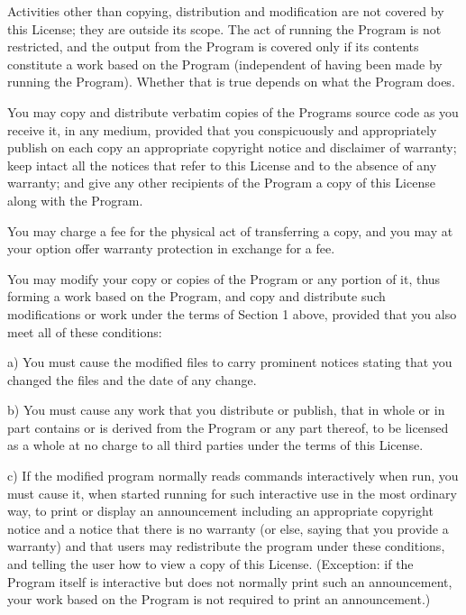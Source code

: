 Activities other than copying, distribution and modification are not covered by this License; they are outside its scope. The act of running the Program is not restricted, and the output from the Program is covered only if its contents constitute a work based on the Program (independent of having been made by running the Program). Whether that is true depends on what the Program does.


\begin{DoxyEnumerate}
\item You may copy and distribute verbatim copies of the Program\textquotesingle{}s source code as you receive it, in any medium, provided that you conspicuously and appropriately publish on each copy an appropriate copyright notice and disclaimer of warranty; keep intact all the notices that refer to this License and to the absence of any warranty; and give any other recipients of the Program a copy of this License along with the Program.
\end{DoxyEnumerate}

You may charge a fee for the physical act of transferring a copy, and you may at your option offer warranty protection in exchange for a fee.


\begin{DoxyEnumerate}
\item You may modify your copy or copies of the Program or any portion of it, thus forming a work based on the Program, and copy and distribute such modifications or work under the terms of Section 1 above, provided that you also meet all of these conditions\+: \begin{DoxyVerb}a) You must cause the modified files to carry prominent notices
stating that you changed the files and the date of any change.

b) You must cause any work that you distribute or publish, that in
whole or in part contains or is derived from the Program or any
part thereof, to be licensed as a whole at no charge to all third
parties under the terms of this License.

c) If the modified program normally reads commands interactively
when run, you must cause it, when started running for such
interactive use in the most ordinary way, to print or display an
announcement including an appropriate copyright notice and a
notice that there is no warranty (or else, saying that you provide
a warranty) and that users may redistribute the program under
these conditions, and telling the user how to view a copy of this
License.  (Exception: if the Program itself is interactive but
does not normally print such an announcement, your work based on
the Program is not required to print an announcement.)
\end{DoxyVerb}

\end{DoxyEnumerate}

